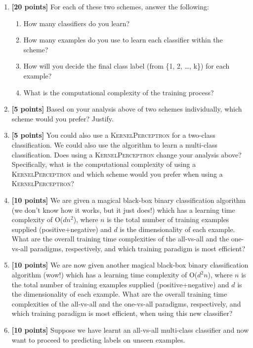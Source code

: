\documentclass[11pt]{article}
\begin{document}
\begin{enumerate}
\item {\bf [20 points]} For each of these two schemes, answer the following:
\begin{enumerate}
\item How many classifiers do you learn?
\item How many examples do you use to learn each classifier within the scheme?
\item How will you decide the final class label (from \{1, 2, \ldots, k\}) for each example?
\item What is the computational complexity of the training process?
\end{enumerate}
\item {\bf [5 points]} Based on your analysis above of two schemes individually, which scheme would you prefer? Justify.
\item {\bf [5 points]} You could also use a \textsc{KernelPerceptron} for a two-class classification. We could also use the algorithm to learn a multi-class classification. Does using a \textsc{KernelPerceptron} change your analysis above? Specifically, what is the computational complexity of using a \textsc{KernelPerceptron} and which scheme would you prefer when using a \textsc{KernelPerceptron}? 

\item {\bf [10 points]} We are given a magical black-box binary classification algorithm (we don’t know how it works, but it just does!) which has a learning time complexity of O($dn^2$), where $n$ is the total number of training examples supplied (positive+negative) and $d$ is the dimensionality of each example.
What are the overall training time complexities of the all-vs-all and the one-vs-all
paradigms, respectively, and which training paradigm is most efficient?

\item {\bf [10 points]} We are now given another magical black-box binary classification algorithm (wow!) which has a learning time complexity of O($d^2 n$), where $n$ is the total number of training examples supplied (positive+negative) and $d$ is the dimensionality of each example.
What are the overall training time complexities of the all-vs-all and the one-vs-all paradigms, respectively, and which training paradigm is most efficient, when using this new classifier?

\item {\bf [10 points]} Suppose we have learnt an all-vs-all multi-class classifier and now want to proceed to predicting labels on unseen examples.


\end{enumerate}
\end{document}

